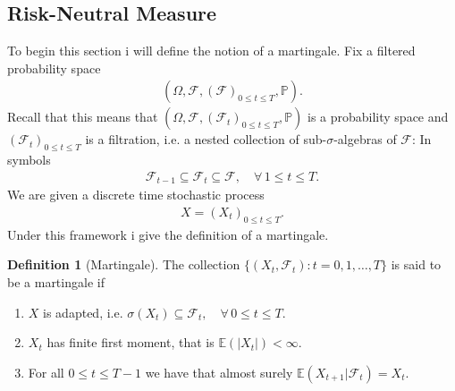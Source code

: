 \documentclass{article}
\theoremstyle{definition}
\newtheorem{definition}[theorem]{Definition}
\numberwithin{equation}{section}
\begin{document}
\subsection{Risk-Neutral Measure}
To begin this section i will define the notion of a martingale.
Fix a filtered probability space
\begin{align}
    \left(
        \Omega, 
        \mathscr{F}, 
        \left(
            \mathscr{F}
        \right)_{0 \leq t \leq T},
        \mathbb{P}
    \right).
\end{align}
Recall that this means that $(\Omega, \mathscr{F}, (\mathscr{F}_t)_{0 \leq t \leq T}, \mathbb{P})$ is a probability space and $(\mathscr{F}_t)_{0 \leq t \leq T}$ is a filtration, i.e. a nested collection of sub-$\sigma$-algebras of $\mathscr{F}$: In symbols
\begin{align}
    \mathscr{F}_{t-1} \subseteq \mathscr{F}_t \subseteq \mathscr{F}, \quad \forall \, 1 \leq t \leq T. 
\end{align}
We are given a discrete time stochastic process
\begin{align}
    X = (X_t)_{0 \leq t \leq T}. 
\end{align}
Under this framework i give the definition of a martingale.
\begin{definition}[Martingale]\label{def:martingale}
    The collection $\{ (X_t, \mathscr{F}_t): t = 0,1, \ldots, T \}$ is said to be a martingale if
    \begin{enumerate}
        \item $X$ is adapted, i.e. $\sigma(X_t) \subseteq \mathscr{F}_t, \quad \forall \, 0 \leq t \leq T$.
        \item $X_t$ has finite first moment, that is $\mathbb{E}(|X_t|) < \infty$. 
        \item For all $0 \leq t \leq T-1$ we have that almost surely $\mathbb{E}(X_{t + 1} | \mathscr{F}_t) = X_t$. 
    \end{enumerate}
\end{definition}
\end{document}
